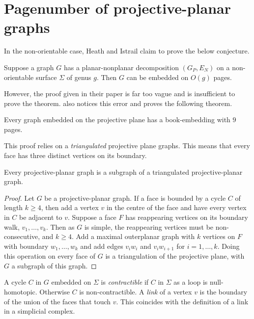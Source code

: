 
\section{Pagenumber of projective-planar graphs}
In the non-orientable case, Heath and Istrail claim to prove the below conjecture.
\begin{conjecture}\label{lem:planar_nonplanar_nonorientable}
	Suppose a graph \(G\) has a planar-nonplanar decomposition \((G_P, E_N)\) on a non-orientable surface \(\Sigma\) of genus $g$. Then \(G\) can be embedded on \( O(g)\) pages.
\end{conjecture}
However, the proof given in their paper is far too vague and is insufficient to prove the theorem. \textcite{nakamotoBookEmbeddingProjectiveplanar2015} also notices this error and proves the following theorem.

\begin{theorem}\label{thm:proj_planar_graphs_9pages}
	Every graph embedded on the projective plane has a book-embedding with $9$ pages.
\end{theorem}

This proof relies on a \textit{triangulated} projective plane graphs. This means that every face has three distinct vertices on its boundary. 

\begin{theorem}
    Every projective-planar graph is a subgraph of a triangulated projective-planar graph.
\end{theorem}

\begin{proof}
    Let $G$ be a projective-planar graph. If a face is bounded by a cycle $C$ of length $k \geq 4$, then add a vertex $v$ in the centre of the face and have every vertex in $C$ be adjacent to $v$. Suppose a face $F$ has reappearing vertices on its boundary walk, $v_1, \ldots, v_k$. Then as $G$ is simple, the reappearing vertices must be non-consecutive, and $k \geq 4$. Add a maximal outerplanar graph with $k$ vertices on $F$ with boundary $w_1, \ldots, w_k$ and add edges $v_i w_i$ and $v_i w_{i + 1}$ for $i = 1, \ldots, k$. Doing this operation on every face of $G$ is a triangulation of the projective plane, with $G$ a subgraph of this graph.  
\end{proof}

A cycle $C$ in $G$ embedded on $\Sigma$ is \textit{contractible} if $C$ in $\Sigma$ as a loop is null-homotopic. Otherwise $C$ is non-contractible. 
A \textit{link} of a vertex $v$ is the boundary of the union of the faces that touch $v$. This coincides with the definition of a link in a simplicial complex.

